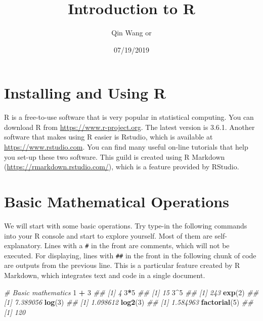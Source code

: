 \documentclass[
]{article}
\title{Introduction to R}
\author{Qin Wang or}
\date{07/19/2019}
\newenvironment{Shaded}{\begin{snugshade}}{\end{snugshade}}
\newcommand{\CommentTok}[1]{\textcolor[rgb]{0.56,0.35,0.01}{\textit{#1}}}
\newcommand{\DecValTok}[1]{\textcolor[rgb]{0.00,0.00,0.81}{#1}}
\newcommand{\KeywordTok}[1]{\textcolor[rgb]{0.13,0.29,0.53}{\textbf{#1}}}
\newcommand{\NormalTok}[1]{#1}
\newcommand{\OperatorTok}[1]{\textcolor[rgb]{0.81,0.36,0.00}{\textbf{#1}}}
\newcommand{\StringTok}[1]{\textcolor[rgb]{0.31,0.60,0.02}{#1}}
\begin{document}
\maketitle

{
\setcounter{tocdepth}{2}
\tableofcontents
}
\hypertarget{installing-and-using-r}{%
\section{Installing and Using R}\label{installing-and-using-r}}

R is a free-to-use software that is very popular in statistical
computing. You can download R from \url{https://www.r-project.org}. The
latest version is 3.6.1. Another software that makes using R easier is
Rstudio, which is available at \url{https://www.rstudio.com}. You can
find many useful on-line tutorials that help you set-up these two
software. This guild is created using R Markdown
(\url{https://rmarkdown.rstudio.com/}), which is a feature provided by
RStudio.

\hypertarget{basic-mathematical-operations}{%
\section{Basic Mathematical
Operations}\label{basic-mathematical-operations}}

We will start with some basic operations. Try type-in the following
commands into your R console and start to explore yourself. Most of them
are self-explanatory. Lines with a \texttt{\#} in the front are
comments, which will not be executed. For displaying, lines with
\texttt{\#\#} in the front in the following chunk of code are outputs
from the previous line. This is a particular feature created by R
Markdown, which integrates text and code in a single document.
\vspace{12pt}

\begin{Shaded}
\begin{Highlighting}[]
    \CommentTok{# Basic mathematics}
    \DecValTok{1} \OperatorTok{+}\StringTok{ }\DecValTok{3}
\CommentTok{## [1] 4}
    \DecValTok{3}\OperatorTok{*}\DecValTok{5}
\CommentTok{## [1] 15}
    \DecValTok{3}\OperatorTok{^}\DecValTok{5}
\CommentTok{## [1] 243}
    \KeywordTok{exp}\NormalTok{(}\DecValTok{2}\NormalTok{)}
\CommentTok{## [1] 7.389056}
    \KeywordTok{log}\NormalTok{(}\DecValTok{3}\NormalTok{)}
\CommentTok{## [1] 1.098612}
    \KeywordTok{log2}\NormalTok{(}\DecValTok{3}\NormalTok{)}
\CommentTok{## [1] 1.584963}
    \KeywordTok{factorial}\NormalTok{(}\DecValTok{5}\NormalTok{)}
\CommentTok{## [1] 120}
\end{Highlighting}
\end{Shaded}
\end{document}
